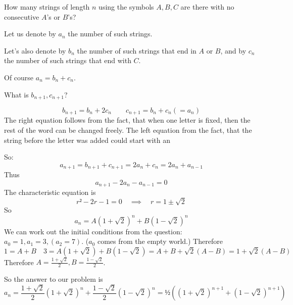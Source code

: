 \documentclass[english]{lbscript}
\begin{document}
\begin{example}{}{}
  How many strings of length \(n\) using the symbols \(A, B, C\) are there with no consecutive \(A\)'s or \(B\)'s?

  Let us denote by \(a_n\) the number of such strings.

  Let's also denote by \(b_n\) the number of such strings that end in \(A\) or \(B\), and by \(c_n\) the number of such strings that end with \(C\).

  Of course \(a_n=b_n+c_n\).

  What is \(b_{n+1}, c_{n+1}\)?


\begin{equation}
\label{eq:82}
b_{n+1}= b_n + 2c_n  \quad \quad c_{n+1} = b_n + c_n (=a_n)
\end{equation}
The right equation follows from the fact, that when one letter is fixed, then the rest of the word can be changed freely. The left equation from the fact, that the string before the letter was added could start with an

So:
\begin{equation}
\label{eq:88}
a_{n+1}= b_{n+1}+c_{n+1} = 2a_n+c_n = 2a_n+a_{n-1}
\end{equation}
Thus
\begin{equation}
\label{eq:89}
a_{n+1} - 2a_n - a_{n-1} = 0
\end{equation}
The characteristic equation is
\begin{equation}
\label{eq:90}
r²-2r -1 = 0 \quad ⟹ \quad  r = 1±\sqrt{2}
\end{equation}
So
\begin{equation}
\label{eq:91}
a_{n} = A(1+\sqrt{2})^{n} + B(1-\sqrt{2})^{n}
\end{equation}
We can work out the initial conditions from the question: \(a_0=1, a_1=3, (a_2=7)\). (\(a_0\) comes from the empty world.)
Therefore
\begin{equation}
\label{eq:92}
1=A+B\quad 3=A(1+\sqrt{2}) + B(1-\sqrt{2})= A+B + \sqrt{2}(A-B) = 1 + \sqrt{2}(A-B)
\end{equation}
Therefore \(A= \frac{1+\sqrt{2}}{2}, B= \frac{1-\sqrt{2}}{2}\).

So the answer to our problem is
\begin{equation}
\label{eq:93}
a_n= \frac{1+\sqrt{2}}{2}\left(1+\sqrt{2} \right)^{n} + \frac{1-\sqrt{2}}{2} \left(1-\sqrt{2} \right)^{n}= ½\left( \left(1+\sqrt{2} \right)^{n+1} + \left(1-\sqrt{2} \right)^{n+1}  \right)
\end{equation}
\end{example}
\end{document}

